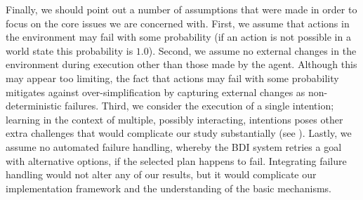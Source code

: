 Finally, we should point out a number of assumptions that were made in order to
focus on the core issues we are concerned with.
First, we assume that actions in the environment may fail with some probability
(if an action is not possible in a world state this probability is $1.0$).
Second, we assume no external changes in the environment during execution other
than those made by the agent. Although this may appear too limiting, the fact
that actions may fail with some probability mitigates against
over-simplification by capturing external changes as
non-deterministic failures.
Third, we consider the execution of a single intention; learning in the context
of multiple, possibly interacting, intentions poses other extra challenges that
would complicate our study substantially (see \cite{Thangarajah02}).
Lastly, we assume no automated failure handling, whereby the BDI system retries
a goal with alternative options, if the selected plan happens to fail. 
Integrating failure handling would not alter any of our results, but it would
complicate our implementation framework and the understanding of the basic
mechanisms.



% 
% 
% 



